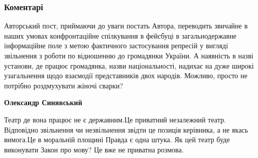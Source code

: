  
 
 
 
 
\subsubsection{Коментарі}

\begin{itemize}
 

Авторський пост, приймаючи до уваги постать Автора, переводить звичайне в наших
умовах конфронтаційне спілкування в фейсбуці в загальнодержавне інформаційне
поле з метою фактичного застосування репресій у вигляді звільнення з роботи по
відношенню до громадянки України. А наявність в назві установи, де працює
громадянка, назви національності, надихає на дуже широкі узагальнення щодо
взаємодії представників двох народів. Можливо, просто не потрібно роздмухувати
жіночі сварки?

\begin{itemize}
 
\textbf{Олександр Синявський} 

Театр де вона працює не є державним.Це приватний незалежний театр. Відповідно
звільнення чи незвільнення звідти це позиція керівника, а не якась вимога.Це в
моральній площині Правда є одна штука. Як цей театр буде виконувати Закон про
мову? Це вже не приватна розмова.



 

\end{itemize}
\end{itemize}

